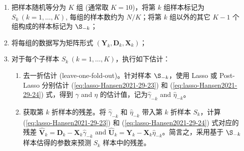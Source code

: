 {    \vspace{5pt}
    \begin{center}
    \end{center}
\begin{enumerate}
\item  把样本随机等分为 $K$ 组 (通常取 $K=10$)，将第 $k$ 组样本标记为 $S_{k}\ (k=1, \ldots, K)$, 每组的样本数约为 $N / K$；将第 $k$ 组以外的其它 $K-1$ 个组构成的样本标记为 $\S_{-k}$；
\item 将每组的数据写为矩阵形式 $\left(\boldsymbol{Y}_{k}, \boldsymbol{D}_{k}, \boldsymbol{X}_{k}\right)$；
\item 对于每个子样本 $S_{k}\ (k=1, \ldots, K)$，执行如下估计：
   \begin{enumerate}
   \item 去一折估计 (leave-one-fold-out)。针对样本 $\S_{-k}$，使用 Lasso 或 Post-Lasso 分别估计 (\ref{eq:lasso-Hansen2021-29-23}) 和 (\ref{eq:lasso-Hansen2021-29-24}) 式，得到 $\gamma$ and $\eta$ 的估计值，记为$\hat{\gamma}_{-k}$ and $\widehat{\eta}_{-k}$。 
   \item 获取第 $k$ 折样本的残差。将 $\hat{\gamma}_{-k}$ 和 $\widehat{\eta}_{-k}$ 带入第 $k$ 折样本 $S_{k}$，计算 (\ref{eq:lasso-Hansen2021-29-23}) 和 (\ref{eq:lasso-Hansen2021-29-24}) 式对应的残差  $\widehat{\boldsymbol{V}}_{k}=\boldsymbol{D}_{k}-\boldsymbol{X}_{k} \widehat{\gamma}_{-k}$ and $\widehat{\boldsymbol{U}}_{k}=\boldsymbol{Y}_{k}-\boldsymbol{X}_{k} \widehat{\eta}_{-k}$。简言之，采用基于 $\S_{-k}$ 样本估得的参数来预测 $S_k$ 样本中的残差。

\end{enumerate}
\end{enumerate}}
